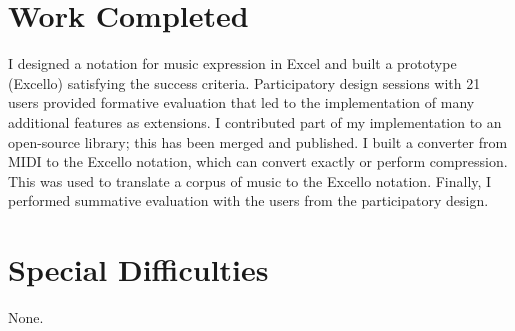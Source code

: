 \section*{Work Completed}

I designed a notation for music expression in Excel and built a prototype (Excello) satisfying the success criteria. Participatory design sessions with 21 users provided formative evaluation that led to the implementation of many additional features as extensions. I contributed part of my implementation to an open-source library; this has been merged and published. I built a converter from MIDI to the Excello notation, which can convert exactly or perform compression. This was used to translate a corpus of music to the Excello notation. Finally, I performed summative evaluation with the users from the participatory design.

\section*{Special Difficulties}

None.

\tableofcontents

